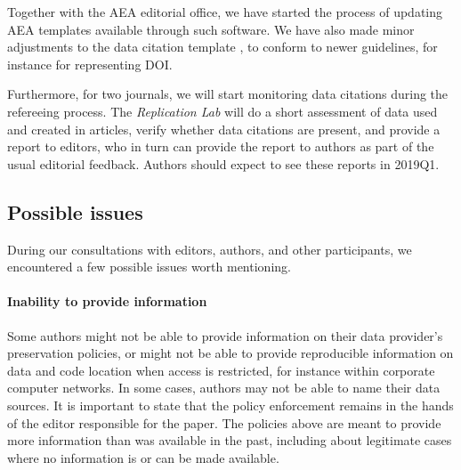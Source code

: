 \documentclass[PP]{AEA}
\begin{document}
Together with the  AEA editorial office, we have   started the process of updating AEA templates available through such software.
We have also made minor adjustments to the data citation template \citep{aeadatarefs}, to conform to newer guidelines, for instance for representing \ac{DOI}.

Furthermore, for two journals, we will start monitoring data citations during the refereeing process. The \textit{Replication Lab} will do a short assessment of data used and created in articles, verify whether data citations are present, and provide a report to editors, who in turn can provide the report to authors as part of the usual editorial feedback. Authors should expect to see these reports in 2019Q1.

\subsection{Possible issues}
During our consultations with editors, authors, and other participants, we encountered a few possible issues worth mentioning.

\paragraph{Inability to provide information} Some authors might not be able to provide information on their data provider's preservation policies, or might not be able to provide reproducible information on data and code location when access is restricted, for instance within corporate computer networks. In some cases, authors may not be able to name their data sources. It is important to state that the policy enforcement remains in the hands of the editor responsible for the paper. The policies above are meant to provide more information than was available in the past, including about legitimate cases where no information is or can be made available.
\end{document}
